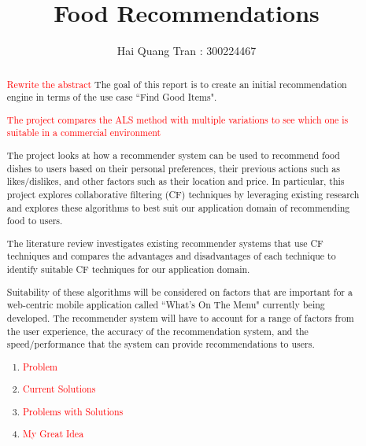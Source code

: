 \documentclass[11pt
, a4paper
, twoside
, openright
]{report}
\title{Food Recommendations}
\author{Hai Quang Tran : 300224467}
\date{}
\newcommand\todo[1]{\textcolor{red}{#1}}
\begin{document}
\frontmatter



\begin{abstract}

\todo{Rewrite the abstract}
The goal of this report is to create an initial recommendation engine in terms of the use case ``Find Good Items". 

\todo{The project compares the ALS method with multiple variations to see which one is suitable in a commercial environment}

The project looks at how a recommender system can be used to recommend food dishes to users based on their personal preferences, their previous actions such as likes/dislikes, and other factors such as their location and price. In particular, this project explores collaborative filtering (CF) techniques by leveraging existing research and explores these algorithms to best suit our application domain of recommending food to users. 

The literature review investigates existing recommender systems that use CF techniques and compares the advantages and disadvantages of each technique to identify suitable CF techniques for our application domain. 

Suitability of these algorithms will be considered on factors that are important for a web-centric mobile application called ``What's On The Menu" currently being developed. The recommender system will have to account for a range of factors from the user experience, the accuracy of the recommendation system, and the speed/performance that the system can provide recommendations to users.

\begin{enumerate}
 \item \todo{Problem}
 \item \todo{Current Solutions}
 \item \todo{Problems with Solutions}
 \item \todo{My Great Idea}
\end{enumerate}


\end{abstract}
\end{document}
